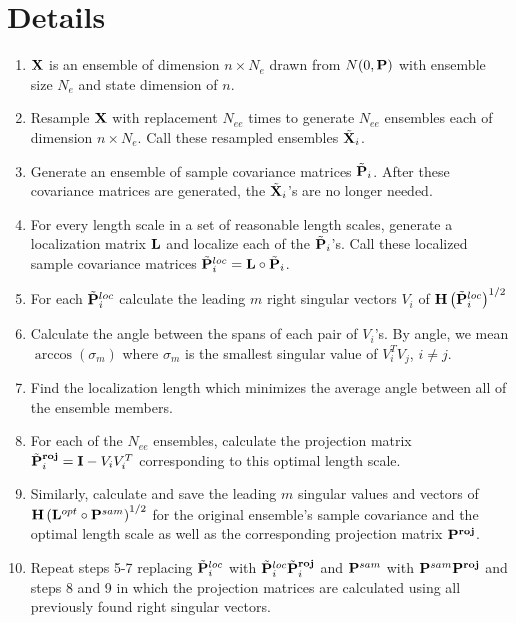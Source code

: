 \documentclass[11pt]{amsart}
\begin{document}
\section{Details}
\begin{enumerate}
\item $\bold{X}$ is an ensemble of dimension $n \times N_e$ drawn from $N(0, \bold{P})$ with ensemble size $N_e$ and state dimension of $n$.

\item Resample $\bold{X}$ with replacement $N_{ee}$ times to generate $N_{ee}$ ensembles each of dimension $n \times N_e$.
  Call these resampled ensembles $\tilde{\bold{X}}_{i}$.

\item Generate an ensemble of sample covariance matrices $\tilde{\bold{P}}_i$.
  After these covariance matrices are generated, the $\tilde{\bold{X}}_i$'s are no longer needed.

\item For every length scale in a set of reasonable length scales, generate a localization matrix $\bold{L}$ and localize each of the $\tilde{\bold{P}}_i$'s.
  Call these localized sample covariance matrices $\tilde{\bold{P}}^{loc}_i = \bold{L} \circ  \tilde{\bold{P}}_i$.

\item For each $\tilde{\bold{P}}^{loc}_i$ calculate the leading $m$ right singular vectors $V_i$ of $\bold{H} \left(\tilde{\bold{P}}^{loc}_i\right)^{1/2}$

\item Calculate the angle between the spans of each pair of $V_i$'s.
  By angle, we mean $\arccos ( \sigma_m )$ where $\sigma_m$ is the smallest singular value of $V_i^T V_j$, $i \neq j$.

\item Find the localization length which minimizes the average angle between all of the ensemble members.

\item For each of the $N_{ee}$ ensembles, calculate the projection matrix $\tilde{\bold{P}}^{\bold{roj}}_i = \bold{I} - V_i V_i^T$ corresponding to this optimal length scale.

\item Similarly, calculate and save the leading $m$ singular values and vectors of $\bold{H} \left(\bold{L}^{opt} \circ \bold{P}^{sam}\right)^{1/2}$ for the original ensemble's sample covariance and the optimal length scale as well as the corresponding projection matrix $\bold{P}^{\bold{roj}}$.

\item Repeat steps 5-7 replacing $\tilde{\bold{P}}^{loc}_i$ with $\tilde{\bold{P}}^{loc}_i \tilde{\bold{P}}^{\bold{roj}}_i$ and $\bold{P}^{sam}$ with $\bold{P}^{sam} \bold{P}^{\bold{roj}}$ and steps 8 and 9 in which the projection matrices are calculated using all previously found right singular vectors.

\end{enumerate}
\end{document}
